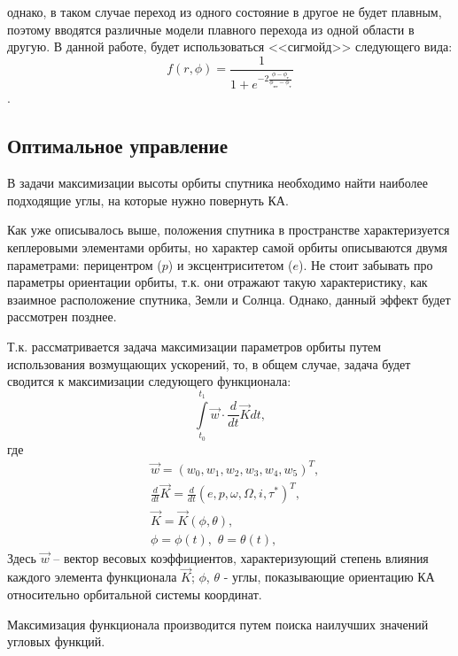 однако, в таком случае переход из одного состояние в другое не будет плавным, поэтому
вводятся различные модели плавного перехода из одной области в другую. В данной работе,
будет использоваться <<сигмойд>> следующего вида:
\begin{equation}
  f(r, \phi) = \frac{1}{1 + e^{-2\frac{\phi - \phi_{\text{т}}}{\phi_{\text{пт}} - \phi_{\text{т}}}}}
\end{equation}.
\subsection{Оптимальное управление}
\noindent\indent В задачи максимизации высоты орбиты спутника необходимо найти
наиболее подходящие углы, на которые нужно повернуть КА.\par
  Как уже описывалось выше, положения спутника в пространстве характеризуется
кеплеровыми элементами орбиты, но характер самой орбиты описываются двумя параметрами:
перицентром ($p$) и эксцентриситетом ($e$). Не стоит забывать про параметры ориентации
орбиты, т.к. они отражают такую характеристику, как взаимное расположение спутника,
Земли и Солнца. Однако, данный эффект будет рассмотрен позднее.\par
  Т.к. рассматривается задача максимизации параметров орбиты путем использования
возмущающих ускорений, то, в общем случае, задача будет сводится к максимизации
следующего функционала:
\begin{equation}
  \int\limits_{t_0}^{t_1} \vec{w} \cdot \frac{d}{dt}\vec{K} dt,
\end{equation}
где
\begin{equation}
  \begin{aligned}
    & \vec{w} = (w_0, w_1, w_2, w_3, w_4, w_5)^T, \\
    & \frac{d}{dt}\vec{K} = \frac{d}{dt}(e, p, \omega, \Omega, i, \tau^*)^T, \\
    & \vec{K} = \vec{K}(\phi, \theta), \\
    & \phi = \phi(t),\,\, \theta = \theta(t),
  \end{aligned}
\end{equation}
Здесь $\vec{w}$ -- вектор весовых коэффициентов, характеризующий степень влияния
каждого элемента функционала $\vec{K}$; $\phi$, $\theta$ - углы, показывающие ориентацию
КА относительно орбитальной системы координат.\par
  Максимизация функционала производится путем поиска наилучших значений угловых
функций.
